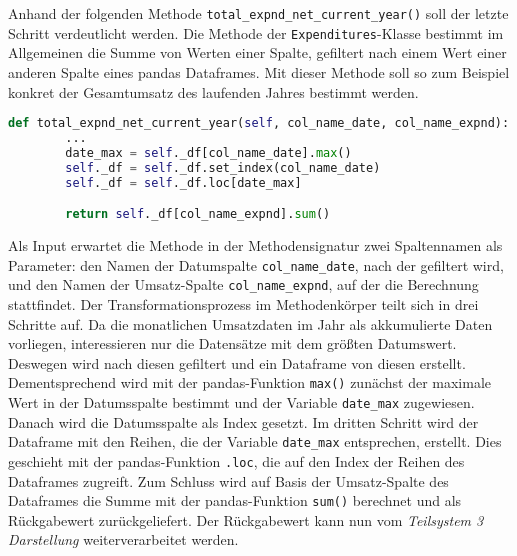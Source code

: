 
    

    Anhand der folgenden Methode \texttt{total\_expnd\_net\_current\_year()} soll der letzte Schritt verdeutlicht werden.
    Die Methode der \texttt{Expenditures}-Klasse bestimmt im Allgemeinen die Summe von Werten einer Spalte, gefiltert
    nach einem Wert einer anderen Spalte eines pandas Dataframes. Mit dieser Methode soll so zum Beispiel konkret der Gesamtumsatz des 
    laufenden Jahres bestimmt werden.

    \begin{lstlisting}[language=Python, caption=Beispiel Methode Expenditures class]
    def total_expnd_net_current_year(self, col_name_date, col_name_expnd):
        ... 
        date_max = self._df[col_name_date].max()        
        self._df = self._df.set_index(col_name_date)
        self._df = self._df.loc[date_max]

        return self._df[col_name_expnd].sum()  
    \end{lstlisting}

    Als Input erwartet die Methode in der Methodensignatur zwei Spaltennamen als Parameter: den Namen der Datumspalte \texttt{col\_name\_date}, nach der gefiltert wird,
    und den Namen der Umsatz-Spalte \texttt{col\_name\_expnd}, auf der die Berechnung stattfindet. Der Transformationsprozess im Methodenkörper teilt sich in drei Schritte auf. Da die monatlichen Umsatzdaten im Jahr als 
    akkumulierte Daten vorliegen, interessieren nur die Datensätze mit dem größten Datumswert. Deswegen
    wird nach diesen gefiltert und ein Dataframe von diesen erstellt. Dementsprechend wird mit der pandas-Funktion \texttt{max()} 
    zunächst der maximale Wert in der Datumsspalte bestimmt und der Variable \texttt{date\_max} zugewiesen. Danach wird die Datumsspalte als Index gesetzt. 
    Im dritten Schritt wird der Dataframe mit den Reihen, die der Variable \texttt{date\_max} entsprechen, erstellt. Dies geschieht mit der pandas-Funktion \texttt{.loc}, die
    auf den Index der Reihen des Dataframes zugreift. Zum Schluss wird auf Basis der Umsatz-Spalte des Dataframes die Summe mit der pandas-Funktion \texttt{sum()} berechnet 
    und als Rückgabewert zurückgeliefert. Der Rückgabewert kann nun vom \textit{Teilsystem 3 Darstellung} weiterverarbeitet werden.\\

